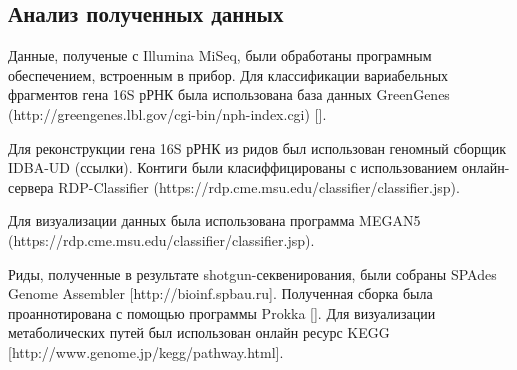 \subsection{Анализ полученных данных}  \label{subsect1_2_5}

Данные, полученые с Illumina MiSeq, были обработаны програмным обеспечением, встроенным в прибор. Для классификации вариабельных фрагментов гена 16S рРНК была использована база данных GreenGenes (http://greengenes.lbl.gov/cgi-bin/nph-index.cgi) []. 

Для реконструкции гена 16S рРНК из ридов был использован геномный сборщик IDBA-UD (ссылки). Контиги были класиффицированы с использованием онлайн-сервера RDP-Classifier (https://rdp.cme.msu.edu/classifier/classifier.jsp). 

Для визуализации данных была использована программа MEGAN5 (https://rdp.cme.msu.edu/classifier/classifier.jsp).

Риды, полученные в результате shotgun-секвенирования, были собраны SPAdes Genome Assembler [http://bioinf.spbau.ru]. Полученная сборка была проаннотирована с помощью программы Prokka []. Для визуализации метаболических путей был использован онлайн ресурс KEGG [http://www.genome.jp/kegg/pathway.html]. 


\clearpage
